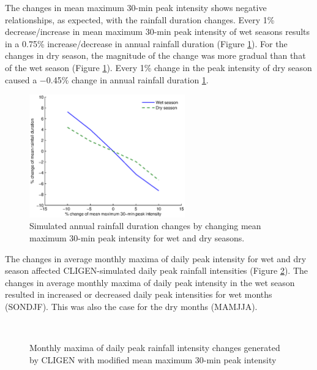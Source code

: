 The changes in mean maximum 30-min peak intensity shows negative relationships,
as expected, with the rainfall duration changes. Every 1\% decrease/increase in
mean maximum 30-min peak intensity of wet seasons results in a 0.75\%
increase/decrease in annual rainfall duration (Figure
\ref{fig:future_rainfall_duration_change}). For the changes in dry season, the
magnitude of the change was more gradual than that of the wet season (Figure
\ref{fig:future_rainfall_duration_change}). Every 1\% change in the peak
intensity of dry season caused a $-$0.45\% change in annual rainfall duration
\ref{fig:future_rainfall_duration_change}.

\begin{figure}[htbp]
  \centering
    \includegraphics[width=0.60\textwidth]
{./img/future_rainfall_duration_change}
  \caption{Simulated annual rainfall duration changes by changing mean
maximum 30-min peak intensity for wet and dry seasons.}
  \label{fig:future_rainfall_duration_change}
\end{figure}

The changes in average monthly maxima of daily peak intensity for wet and dry
season affected CLIGEN-simulated daily peak rainfall intensities (Figure
\ref{fig:future_monthly_intensity}). The changes in average monthly maxima of
daily peak intensity in the wet season resulted in increased or decreased daily
peak intensities for wet months (SONDJF). This was also the case for the dry
months (MAMJJA).

\begin{figure}[htbp]
  \centering
    \\
  \caption{Monthly maxima of daily peak rainfall intensity changes
generated by CLIGEN with modified mean maximum 30-min peak intensity}
  \label{fig:future_monthly_intensity}
\end{figure}

